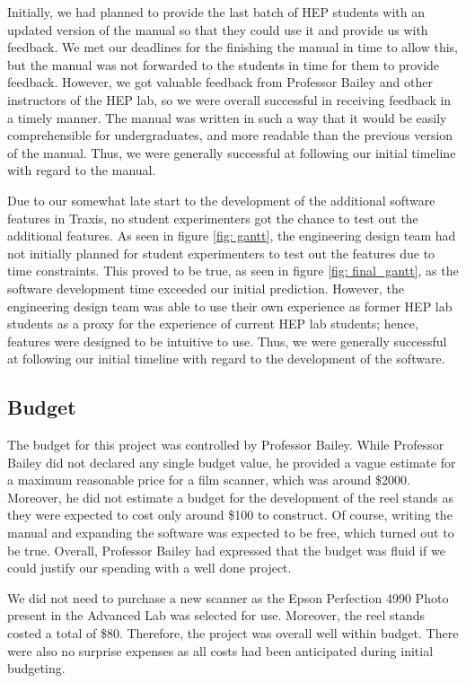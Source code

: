 \documentclass[12pt]{article} %
\begin{document}
Initially, we had planned to provide the last batch of HEP students with an updated version of the manual so that they could use it and provide us with feedback. We met our deadlines for the finishing the manual in time to allow this, but the manual was not forwarded to the students in time for them to provide feedback. However, we got valuable feedback from Professor Bailey and other instructors of the HEP lab, so we were overall successful in receiving feedback in a timely manner. The manual was written in such a way that it would be easily comprehensible for undergraduates, and more readable than the previous version of the manual. Thus, we were generally successful at following our initial timeline with regard to the manual. 

Due to our somewhat late start to the development of the additional  software features in Traxis, no student experimenters got the chance to test out the additional features. As seen in figure \ref{fig: gantt}, the engineering design team had not initially planned for student experimenters to test out the features due to time constraints. This proved to be true, as seen in figure \ref{fig: final_gantt}, as the software development time exceeded our initial prediction. However, the engineering design team was able to use their own experience as former HEP lab students as a proxy for the experience of current HEP lab students; hence, features were designed to be intuitive to use. Thus, we were generally successful at following our initial timeline with regard to the development of the software. 

\subsection{Budget}
The budget for this project was controlled by Professor Bailey. While Professor Bailey did not declared any single budget value, he provided a vague estimate for a maximum reasonable price for a film scanner, which was around \$2000. Moreover, he did not estimate a budget for the development of the reel stands as they were expected to cost only around \$100 to construct. Of course, writing the manual and expanding the software was expected to be free, which turned out to be true. Overall, Professor Bailey had expressed that the budget was fluid if we could justify our spending with a well done project.

We did not need to purchase a new scanner as the Epson Perfection 4990 Photo present in the Advanced Lab was selected for use. Moreover, the reel stands costed a total of \$80. Therefore, the project was overall well within budget. There were also no surprise expenses as all costs had been anticipated during initial budgeting.

\newpage



\end{document}
